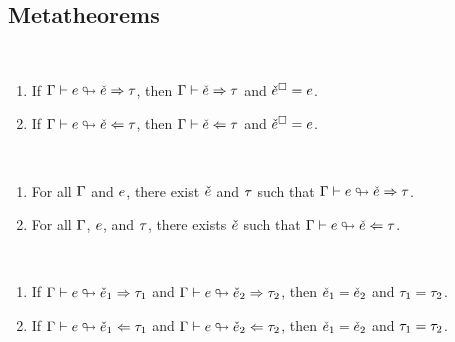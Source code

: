 \documentclass{article}
\begin{document}
\subsection{Metatheorems}
\begin{theorem}[name=Mark Insertion] \
  \begin{enumerate}
    \item If $\Gamma \vdash e \looparrowright \check{e} \Rightarrow \tau$, then $\Gamma \vdash \check{e} \Rightarrow \tau$ and
      $\check{e}^{\square} = e$.
    \item If $\Gamma \vdash e \looparrowright \check{e} \Leftarrow \tau$, then $\Gamma \vdash \check{e} \Leftarrow \tau$ and
      $\check{e}^{\square} = e$.
  \end{enumerate}
\end{theorem}

\begin{theorem}[name=Totality] \
  \begin{enumerate}
    \item For all $\Gamma$ and $e$, there exist $\check{e}$ and $\tau$ such that
      $\Gamma \vdash e \looparrowright \check{e} \Rightarrow \tau$.
    \item For all $\Gamma$, $e$, and $\tau$, there exists $\check{e}$ such that
      $\Gamma \vdash e \looparrowright \check{e} \Leftarrow \tau$.
  \end{enumerate}
\end{theorem}

\begin{theorem}[name=Unicity] \
  \begin{enumerate}
    \item If $\Gamma \vdash e \looparrowright \check{e}_1 \Rightarrow \tau_1$ and
      $\Gamma \vdash e \looparrowright \check{e}_2 \Rightarrow \tau_2$, then $\check{e}_1 = \check{e}_2$ and $\tau_1 =
      \tau_2$.
    \item If $\Gamma \vdash e \looparrowright \check{e}_1 \Leftarrow \tau_1$ and
      $\Gamma \vdash e \looparrowright \check{e}_2 \Leftarrow \tau_2$, then $\check{e}_1 = \check{e}_2$ and $\tau_1 =
      \tau_2$.
  \end{enumerate}
\end{theorem}
\end{document}

